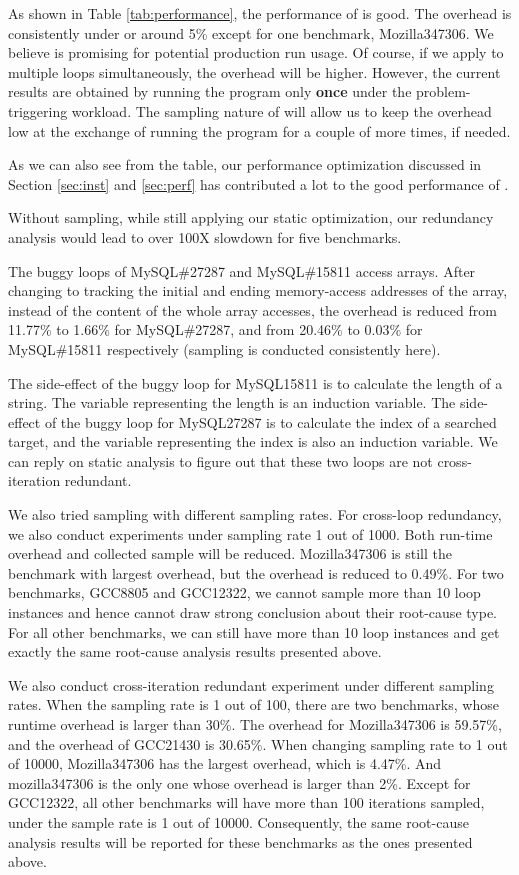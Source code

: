 As shown in Table \ref{tab:performance}, 
the performance of \Tool is good. The overhead is consistently under or around 5\% 
except for one benchmark, Mozilla347306. We believe \Tool is promising for potential production
run usage. Of course, if we apply \Tool to multiple loops simultaneously,
the overhead will be higher. However, the current results are obtained by running the
program only \textbf{once} under the problem-triggering workload. The sampling nature
of \Tool will allow us to keep the overhead low at the exchange of running the program for
a couple of more times, if needed.

As we can also see from the table, our performance optimization discussed in 
Section \ref{sec:inst} and \ref{sec:perf} has contributed
a lot to the good performance of \Tool.

Without sampling, while still applying our static optimization, our redundancy
analysis would lead to over 100X slowdown for five benchmarks.

The buggy loops of MySQL\#27287 and MySQL\#15811 access arrays. 
After changing to tracking the initial and ending memory-access addresses
of the array, instead of the content of the whole array accesses,
the overhead is reduced from 11.77\% to 1.66\% for MySQL\#27287, 
and from 20.46\% to 0.03\% for MySQL\#15811 respectively 
(sampling is conducted consistently here). 

The side-effect of the buggy loop for MySQL15811 is to calculate the length of a string. 
The variable representing the length is an induction variable. 
The side-effect of the buggy loop for MySQL27287 is to calculate the index of a searched target, 
and the variable representing the index is also an induction variable. 
We can reply on static analysis to figure out that these two loops are not cross-iteration redundant.

We also tried sampling with different sampling rates.
For cross-loop redundancy, we also conduct experiments under sampling rate 1
out of 1000. 
Both run-time overhead and collected sample will be reduced. Mozilla347306 
is still the benchmark with largest overhead, but the overhead is reduced to 0.49\%. For two benchmarks, GCC8805 and GCC12322, we cannot sample 
more than 10 loop instances and hence cannot draw strong conclusion
about their root-cause type. For all other benchmarks, we can 
still have more than 10 loop instances and get exactly the same 
root-cause analysis results presented above.

We also conduct cross-iteration redundant experiment under different sampling rates. When the sampling rate is 1 out of 100, there are two benchmarks, whose runtime overhead is larger than 30\%. The overhead for Mozilla347306 is 59.57\%, 
and the overhead of GCC21430 is 30.65\%. When changing sampling rate to 1
out of 10000, Mozilla347306 has the largest overhead, which is 4.47\%. And mozilla347306 is the only one whose overhead is larger than 2\%. Except for 
GCC12322, all other benchmarks will have more than 100 iterations sampled, under the sample rate is 1 out of 10000. Consequently, the same root-cause
analysis results will be reported for these benchmarks as the ones presented
above.
